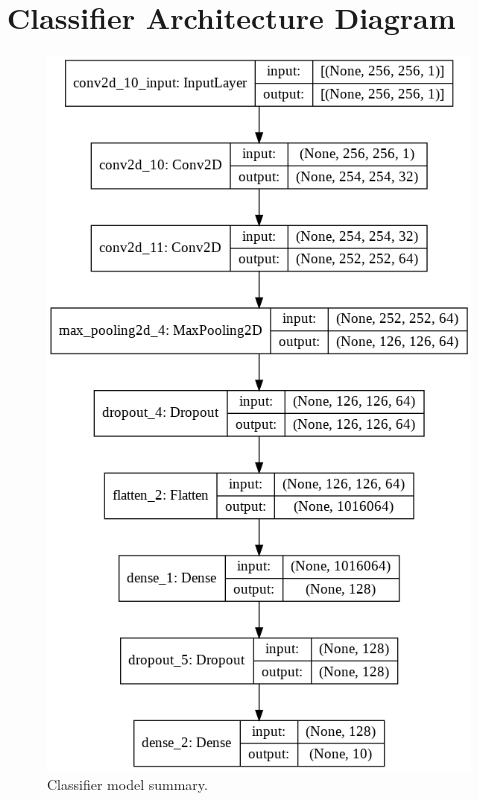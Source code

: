 \section{Classifier Architecture Diagram}
\begin{figure}[H]
        \vspace*{3cm}
	    \begin{center} 
	    \includegraphics[scale=0.45]{images/Appendix/ClassifierModelSummary.png}
	     \caption{Classifier model summary.}
	     \label{fig:ClassifierModelSummary}
	    \end{center}
\end{figure}



